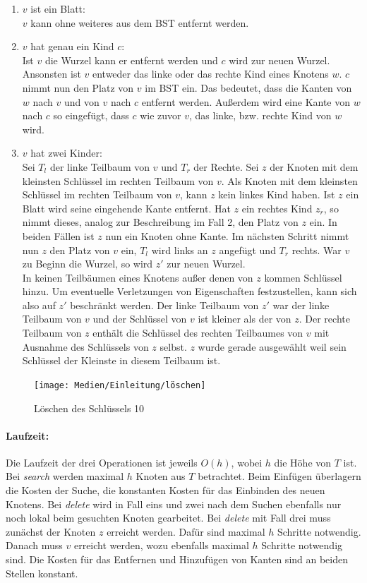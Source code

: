 \documentclass[a4paper,12pt]{article}
\begin{document}
\begin{enumerate}
	\item $v$ ist ein Blatt: \\
	$v$ kann ohne weiteres aus dem BST entfernt werden.
	\item $v$ hat genau ein Kind $c$:\\
	Ist $v$ die Wurzel kann er entfernt werden und $c$ wird zur neuen Wurzel. Ansonsten ist $v$ entweder das linke oder das rechte Kind eines Knotens $w$. $c$ nimmt nun den Platz von $v$ im BST ein. Das bedeutet, dass die Kanten von $w$ nach $v$ und von $v$ nach $c$ entfernt werden. Außerdem wird eine Kante von $w$ nach $c$ so eingefügt, dass $c$ wie zuvor $v$, das linke, bzw. rechte Kind von $w$ wird. 
	\item $v$ hat zwei Kinder:\\
	Sei $T_l$ der linke Teilbaum von $v$ und $T_r$ der Rechte.
	Sei $z$ der Knoten mit dem kleinsten Schlüssel im rechten Teilbaum von $v$. Als Knoten mit dem kleinsten Schlüssel im rechten Teilbaum von $v$, kann $z$ kein linkes Kind haben. Ist $z$ ein Blatt wird seine eingehende Kante entfernt. Hat $z$ ein rechtes Kind $z_r$, so nimmt dieses, analog zur Beschreibung im Fall 2, den Platz von $z$ ein. In beiden Fällen ist $z$ nun ein Knoten ohne Kante. Im nächsten Schritt nimmt nun $z$ den Platz von $v$ ein, $T_l$ wird links an $z$ angefügt und $T_r$ rechts. War $v$ zu Beginn die Wurzel, so wird $z'$ zur neuen Wurzel.\\
	In keinen Teilbäumen eines Knotens außer denen von $z$ kommen Schlüssel hinzu. Um eventuelle Verletzungen von Eigenschaften festzustellen, kann sich also auf $z'$ beschränkt werden. Der linke Teilbaum von $z'$ war der linke Teilbaum von $v$ und der Schlüssel von $v$ ist kleiner als der von $z$. Der rechte Teilbaum von $z$ enthält die Schlüssel des rechten Teilbaumes von $v$ mit Ausnahme des Schlüssels von $z$ selbst. $z$ wurde gerade ausgewählt weil sein Schlüssel der Kleinste in diesem Teilbaum ist. 
	
	
	
	
\end{enumerate} 
\begin{figure}[H]
	\centering
	\texttt{[image: Medien/Einleitung/löschen]}
	\caption{Löschen des Schlüssels 10}
	\label{fig:löschen}
\end{figure}
\paragraph{Laufzeit:}
Die Laufzeit der drei Operationen ist jeweils $\mathit{O(h)}$, wobei $h$ die Höhe von $T$ ist. Bei \textit{search} werden maximal $h$ Knoten aus $T$ betrachtet. Beim Einfügen überlagern die Kosten der Suche, die konstanten Kosten für das Einbinden des neuen Knotens. Bei \textit{delete} wird in Fall eins und zwei nach dem Suchen ebenfalls nur noch lokal beim gesuchten Knoten gearbeitet. Bei \textit{delete} mit Fall drei muss zunächst der Knoten $z$ erreicht werden. Dafür sind maximal $h$ Schritte notwendig. Danach muss $v$ erreicht werden, wozu ebenfalls maximal $h$ Schritte notwendig sind. Die Kosten für das Entfernen und Hinzufügen von Kanten sind an beiden Stellen konstant.  
\end{document}
